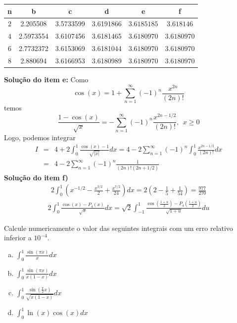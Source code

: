 \begin{resp}
\begin{center}
\begin{tabular}{|c|c|c|c|c|c|}
\hline
n   & b& c&d&e&f\\
\hline
$2$ & 2.205508&  3.5733599 &3.6191866&$3.6185185$&$3.618146$\\
\hline
$4$ &2.5973554&  3.6107456&3.6181465&$3.6180970$&$3.6180970$\\
\hline
$6$ &2.7732372&  3.6153069&3.6181044&$3.6180970$&$3.6180970$\\
\hline
$8$ &2.880694&  3.6166953&3.6180989&$3.6180970$&$3.6180970$\\
\hline
\end{tabular}
\end{center}

{\bf Solução do item e:}
Como $$\cos(x)=1+\sum_{n=1}^\infty(-1)^n\frac{x^{2n}}{(2n)!}$$
temos
$$\frac{1-\cos(x)}{\sqrt{x}}=-\sum_{n=1}^\infty(-1)^{n}\frac{x^{2n-1/2}}{(2n)!},~~x\geq0$$
Logo, podemos integrar
\begin{eqnarray*}
I&=&4+2\int_{0}^1\frac{\cos(x)-1}{\sqrt{|x|}}dx=4-2\sum_{n=1}^\infty(-1)^{n}\int_0^1\frac{x^{2n-1/2}}{(2n)!}dx\\
&=&4-2\sum_{n=1}^\infty(-1)^{n}\frac{1}{(2n)!(2n+1/2)}
\end{eqnarray*}
{\bf Solução do item f)}
\begin{eqnarray*}2\int_{0}^1\left(x^{-1/2}-\frac{x^{3/2}}{2}+\frac{x^{7/2}}{24}\right)dx=2\left(2-\frac{1}{5}+\frac{1}{54}\right)=\frac{977}{270}
\end{eqnarray*}
\begin{eqnarray*}2\int_{0}^1\frac{\cos(x)-P_4(x)}{\sqrt{x}}dx=\sqrt{2}\int_{-1}^1\frac{\cos\left(\frac{1+u}{2}\right)-P_4\left(\frac{1+u}{2}\right)}{\sqrt{1+u}}du
\end{eqnarray*}
\end{resp}

\begin{exer}Calcule numericamente o valor das seguintes integrais com um erro relativo inferior a $10^{-4}$.
\begin{enumerate}[a)]
\item $\displaystyle\int_0^1\frac{\sin(\pi x)}{x}dx$
\item $\displaystyle\int_0^1\frac{\sin(\pi x)}{x(1-x)}dx$
\item $\displaystyle \int_0^1\frac{\sin\left(\frac{\pi}{2} x\right)}{\sqrt{x(1-x)}}dx$
\item $\displaystyle \int_0^1\ln(x) \cos(x) dx$
\end{enumerate}
\end{exer}

